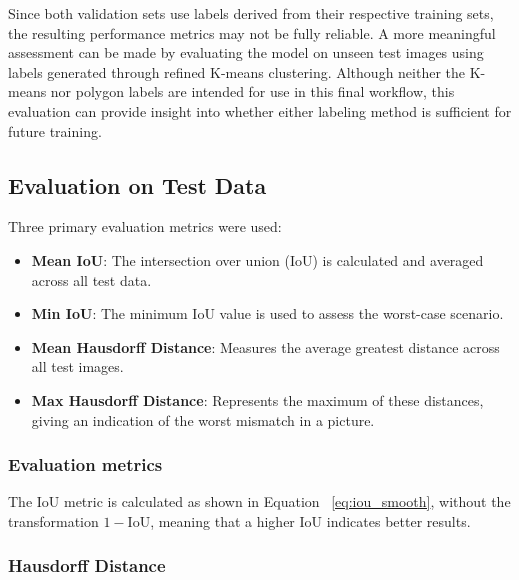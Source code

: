 Since both validation sets use labels derived from their respective training sets, the resulting performance metrics may not be fully reliable. A more meaningful assessment can be made by evaluating the model on unseen test images using labels generated through refined K-means clustering. Although neither the K-means nor polygon labels are intended for use in this final workflow, this evaluation can provide insight into whether either labeling method is sufficient for future training.



\subsection{Evaluation on Test Data}

Three primary evaluation metrics were used:

\begin{itemize} 
\item \textbf{Mean IoU}: The intersection over union (IoU) is calculated and averaged across all test data. 
\item \textbf{Min IoU}: The minimum IoU value is used to assess the worst-case scenario. 
\item \textbf{Mean Hausdorff Distance}: Measures the average greatest distance across all test images. 
\item \textbf{Max Hausdorff Distance}: Represents the maximum of these distances, giving an indication of the worst mismatch in a picture. \end{itemize}

\subsubsection{Evaluation metrics}

The IoU metric is calculated as shown in Equation ~\ref{eq:iou_smooth}, without the transformation $1 - \text{IoU}$, meaning that a higher IoU indicates better results.

\subsubsection{Hausdorff Distance}

